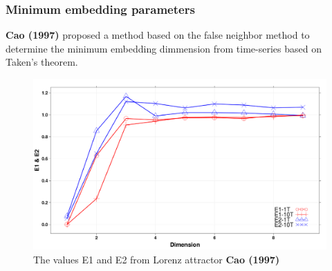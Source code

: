 \documentclass{beamer}
\begin{document}
\begin{frame}
\frametitle{Minimum embedding parameters}

\textbf{Cao (1997)} proposed a method 
based on the false neighbor method
to determine the minimum embedding dimmension
from time-series based on Taken's theorem.


\begin{figure}
\centering 
\includegraphics[scale=0.15]{e1e2cao1997} \\
The values E1 and E2 from Lorenz attractor \textbf{Cao (1997)}
\end{figure}
\end{frame}









%    
%   
\end{document}
